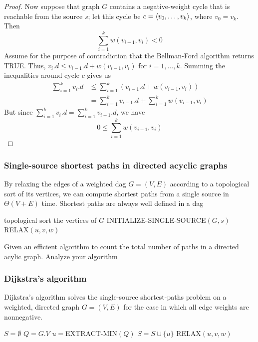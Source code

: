 \documentclass[11pt]{article}
\begin{document}
\begin{proof}
Now suppose that graph \(G\) contains a negative-weight cycle that is reachable from the
source \(s\); let this cycle be \(c=\langle v_0,\dots,v_k\rangle\), where \(v_0=v_k\). Then
\begin{equation*}
\sum_{i=1}^kw(v_{i-1},v_i)<0
\end{equation*}
Assume for the purpose of contradiction that the Bellman-Ford algorithm returns TRUE.
Thus, \(v_i.d\le v_{i-1}.d+w(v_{i-1},v_i)\) for \(i=1,\dots,k\). Summing the inequalities around
cycle \(c\) gives us
\begin{align*}
\sum_{i=1}^kv_i.d&\le\sum_{i=1}^k(v_{i-1}.d+w(v_{i-1},v_i))\\
&=\sum_{i=1}^kv_{i-1}.d+\sum_{i=1}^kw(v_{i-1},v_i)
\end{align*}
But since \(\sum_{i=1}^kv_i.d=\sum_{i=1}^kv_{i-1}.d\), we have
\begin{equation*}
0\le\sum_{i=1}^kw(v_{i-1},v_i)
\end{equation*}
\end{proof}

\begin{exercise}

\end{exercise}
\subsubsection{Single-source shortest paths in directed acyclic graphs}
\label{sec:orgd5c692a}
By relaxing the edges of a weighted dag \(G=(V,E)\) according to a topological sort of its
vertices, we can compute shortest paths from a single source in \(\Theta(V+E)\) time. Shortest paths
are always well defined in a dag

\begin{algorithmic}[1]
\State topological sort the vertices of \(G\)
\State INITIALIZE-SINGLE-SOURCE\((G,s)\)
        RELAX\((u,v,w)\)
    \EndFor
\EndFor
\EndProcedure
\end{algorithmic}

\begin{exercise}[24.2-4]
Given an efficient algorithm to count the total number of paths in a directed acylic graph.
Analyze your algorithm
\end{exercise}
\subsubsection{Dijkstra's algorithm}
\label{sec:orgb563df3}
Dijkstra's algorithm solves the single-source shortest-paths problem on a weighted, directed
graph \(G=(V,E)\) for the case in which all edge weights are nonnegative.
\begin{algorithmic}[1]
\State \(S=\emptyset\)
\State \(Q=G.V\)
    \State \(u=\)EXTRACT-MIN\((Q)\)
    \State \(S=S\cup\{u\}\)
        RELAX\((u,v,w)\)
    \EndFor
\EndWhile
\EndProcedure
\end{algorithmic}
\end{document}
